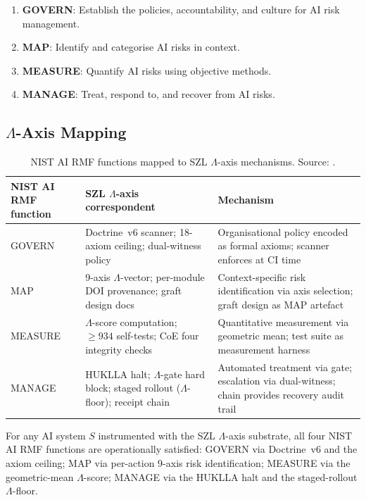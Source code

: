 \begin{enumerate}
  \item \textbf{GOVERN}: Establish the policies, accountability, and culture
    for AI risk management.
  \item \textbf{MAP}: Identify and categorise AI risks in context.
  \item \textbf{MEASURE}: Quantify AI risks using objective methods.
  \item \textbf{MANAGE}: Treat, respond to, and recover from AI risks.
\end{enumerate}

\subsection{$\Lambda$-Axis Mapping}
\label{ssec:lambda-rmf-mapping}

\begin{table}[ht]
\centering
\begin{tabular}{p{2.5cm}|p{4cm}|p{5.5cm}}
\textbf{NIST AI RMF function} & \textbf{SZL $\Lambda$-axis correspondent} & \textbf{Mechanism} \\
\hline
GOVERN & Doctrine~v6 scanner; 18-axiom ceiling; dual-witness policy & Organisational policy encoded as formal axioms; scanner enforces at CI time \\
\hline
MAP & 9-axis $\Lambda$-vector; per-module DOI provenance; graft design docs & Context-specific risk identification via axis selection; graft design as MAP artefact \\
\hline
MEASURE & $\Lambda$-score computation; $\geq 934$ self-tests; CoE four integrity checks & Quantitative measurement via geometric mean; test suite as measurement harness \\
\hline
MANAGE & HUKLLA halt; $\Lambda$-gate hard block; staged rollout ($\Lambda$-floor); receipt chain & Automated treatment via gate; escalation via dual-witness; chain provides recovery audit trail \\
\end{tabular}
\caption{NIST AI RMF functions mapped to SZL $\Lambda$-axis mechanisms.
  Source: \cite{nist_ai_rmf}.}
\label{tab:rmf-mapping}
\end{table}

\begin{theorem}
  \label{thm:rmf-completeness}
  For any AI system $S$ instrumented with the SZL $\Lambda$-axis substrate,
  all four NIST AI RMF functions are operationally satisfied:
  GOVERN via Doctrine~v6 and the axiom ceiling;
  MAP via per-action 9-axis risk identification;
  MEASURE via the geometric-mean $\Lambda$-score;
  MANAGE via the HUKLLA halt and the staged-rollout $\Lambda$-floor.
\end{theorem}

